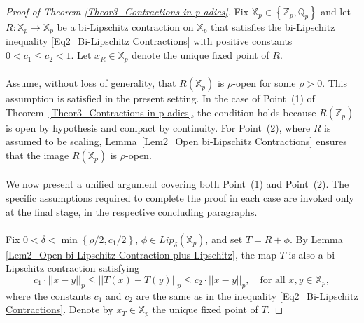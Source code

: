 \documentclass[10pt,a4paper]{amsart}
\begin{document}
	\begin{proof}[Proof of Theorem \ref{Theor3_Contractions in p-adics}] 
		
		Fix $\mathbb{X}_{p} \in  \left\{  \mathbb{Z}_{p}, \mathbb{Q}_{p}  \right\} $ and let $R: \mathbb{X}_{p} \to \mathbb{X}_{p}$ be a bi-Lipschitz contraction on $\mathbb{X}_{p}$ that satisfies the bi-Lipschitz inequality \eqref{Eq2_Bi-Lipschitz Contractions} with positive constants $0  < c_{1} \le c_{2}  < 1$. Let $x_{R} \in \mathbb{X}_{p}$ denote the unique fixed point of $R$. 
		
		
		
		\paragraph{}
		
		Assume, without loss of generality, that $R \left(  \mathbb{X}_{p}  \right) $ is $\rho$-open for some $\rho > 0$. 
		This assumption is satisfied in the present setting. 
		In the case of Point~(1) of Theorem~\ref{Theor3_Contractions in p-adics}, the condition holds because $R \left(  \mathbb{Z}_{p}  \right) $ is open by hypothesis and compact by continuity. 
		For Point~(2), where $R$ is assumed to be scaling, Lemma~\ref{Lem2_Open bi-Lipschitz Contractions} ensures that the image $R \left(  \mathbb{X}_{p}  \right) $ is $\rho$-open.
		
		
		\paragraph{}
		
		We now present a unified argument covering both Point~(1) and Point~(2). The specific assumptions required to complete the proof in each case are invoked only at the final stage, in the respective concluding paragraphs. 
		
		
		
		\paragraph{}
		
		
		
		Fix $0  < \delta  <  \min  \left\{  \rho/2, c_{1}/2  \right\} $, $\phi \in Lip_{\delta} \left(  \mathbb{X}_{p}  \right) $, and set $T = R + \phi$. By Lemma \ref{Lem2_Open bi-Lipschitz Contraction plus Lipschitz}, the map $T$ is also a bi-Lipschitz contraction satisfying   
		\begin{equation}\label{Eq3_Contraction T Lower Bound}
			c_{1} \cdot  \left| \left|  x - y  \right|  \right|_{p}   \le    \left| \left|  T(x) - T(y)  \right|  \right|_{p}    \le   c_{2} \cdot  \left| \left|  x - y  \right|  \right|_{p}, \quad \text{for all } x,y \in \mathbb{X}_{p}, 
		\end{equation}
		where the constants $c_{1}$ and $ c_{2} $ are the same as in the inequality \eqref{Eq2_Bi-Lipschitz Contractions}. Denote by $x_{T} \in \mathbb{X}_{p}$ the unique fixed point of $T$. 
		

\end{proof}
\end{document}
